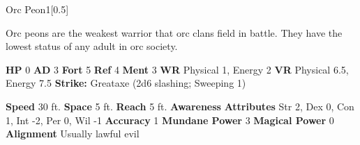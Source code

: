   \begin{monsubsection}{Orc Peon}{1}[0.5]
    \vspace{-1em}\vspace{-1em}
    \vspace{0em}

    
          Orc peons are the weakest warrior that orc clans field in battle.
          They have the lowest status of any adult in orc society.
        

    \begin{spellcontent}
      \begin{spelltargetinginfo}
        \pari \textbf{HP} 0 \monsep
          \textbf{AD} 3 \monsep
          \textbf{Fort} 5 \monsep
          \textbf{Ref} 4 \monsep
          \textbf{Ment} 3
        \pari \textbf{WR} Physical 1, Energy 2 \monsep
        \textbf{VR} Physical 6.5, Energy 7.5
        \pari \textbf{Strike:}
            Greataxe  (2d6 slashing; Sweeping 1)
      \end{spelltargetinginfo}
    \end{spellcontent}
    \begin{monsterfooter}
      \pari \textbf{Speed} 30 ft. \monsep
        \textbf{Space} 5 ft. \monsep
        \textbf{Reach} 5 ft.
      \pari \textbf{Awareness} 
      \pari \textbf{Attributes}
        Str 2, Dex 0,
        Con 1, Int -2,
        Per 0, Wil -1
      \pari \textbf{Accuracy} 1 \monsep
        \textbf{Mundane Power} 3 \monsep
      \textbf{Magical Power} 0
      \pari \textbf{Alignment} Usually lawful evil
    \end{monsterfooter}
  \end{monsubsection}
  
  

